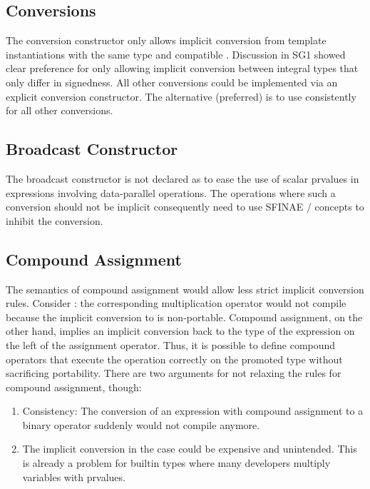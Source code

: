 \subsection{Conversions}
The \datapar conversion constructor only allows implicit conversion from \datapar template instantiations with the same  type and compatible .
Discussion in SG1 showed clear preference for only allowing implicit conversion between integral types that only differ in signedness.
All other conversions could be implemented via an explicit conversion constructor.
The alternative (preferred) is to use \simdcast consistently for all other conversions.

\subsection{Broadcast Constructor}
The broadcast constructor is not declared as  to ease the use of scalar prvalues in expressions involving data-parallel operations.
The operations where such a conversion should not be implicit consequently need to use SFINAE / concepts to inhibit the conversion.

\subsection{Compound Assignment}
The semantics of compound assignment would allow less strict implicit conversion rules.
Consider : the corresponding multiplication operator would not compile because the implicit conversion to \datapar[<float>] is non-portable.
Compound assignment, on the other hand, implies an implicit conversion back to the type of the expression on the left of the assignment operator.
Thus, it is possible to define compound operators that execute the operation correctly on the promoted type without sacrificing portability.
There are two arguments for not relaxing the rules for compound assignment, though:
\begin{enumerate}
  \item Consistency: The conversion of an expression with compound assignment to a binary operator suddenly would not compile anymore.
  \item The implicit conversion in the  case could be expensive and unintended.
    This is already a problem for builtin types where many developers multiply \float variables with \double prvalues.
\end{enumerate}

